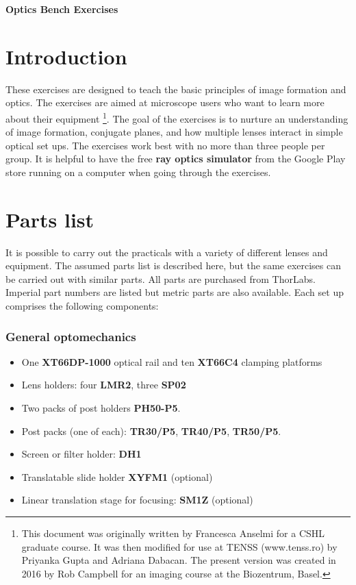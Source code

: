 \documentclass[a4paper]{report}
\begin{document}
\setcounter{secnumdepth}{2}

\begin{center}
\textbf{\Large{Optics Bench Exercises}}
\end{center}

\section{Introduction}
These exercises are designed to teach the basic principles of image formation and optics. 
The exercises are aimed at microscope users who want to learn more about their equipment
\footnote{This document was originally written by Francesca Anselmi for a CSHL graduate course.
It was then modified for use at TENSS (www.tenss.ro) by Priyanka Gupta and Adriana Dabacan. 
The present version was created in 2016 by Rob Campbell for an imaging course at the Biozentrum, Basel.}.
The goal of the exercises is to nurture an understanding of image formation, conjugate planes, and how multiple lenses interact in simple optical set ups. 
The exercises work best with no more than three people per group.
It is helpful to have the free \textbf{ray optics simulator} from the Google Play store running on a computer when going through the exercises. 

\section{Parts list}
It is possible to carry out the practicals with a variety of different lenses and equipment. 
The assumed parts list is described here, but the same exercises can be carried out with similar parts. 
All parts are purchased from ThorLabs.
Imperial part numbers are listed but metric parts are also available. 
Each set up comprises the following components:


\subsubsection{General optomechanics}
\begin{itemize}
\item One \textbf{XT66DP-1000} optical rail and ten \textbf{XT66C4} clamping platforms
\item Lens holders: four \textbf{LMR2}, three \textbf{SP02}
\item Two packs of post holders \textbf{PH50-P5}.
\item Post packs (one of each): \textbf{TR30/P5}, \textbf{TR40/P5}, \textbf{TR50/P5}.
\item Screen or filter holder: \textbf{DH1}
\item Translatable slide holder \textbf{XYFM1} (optional)
\item Linear translation stage for focusing: \textbf{SM1Z} (optional)
\end{itemize}
\end{document}
